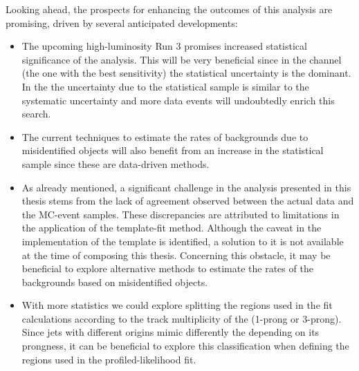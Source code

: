 Looking ahead, the prospects for enhancing the outcomes of this analysis are promising, driven by several anticipated developments:
\begin{itemize}
	\item The upcoming high-luminosity Run 3 promises increased statistical significance of the analysis.
		This will be very beneficial since in the \dilepSStau channel (the one with the best sensitivity)
		the statistical uncertainty is the dominant. In the \dilepOStau the uncertainty due to the statistical
		sample is similar to the systematic uncertainty and more data events will undoubtedly enrich this search.

	\item The current techniques to estimate the rates of backgrounds due to misidentified objects will also
		benefit from an increase in the statistical sample since these are data-driven methods.

	\item As already mentioned, a significant challenge in the analysis presented in this thesis stems from the 
		lack of agreement observed between the actual data and the MC-event samples. 
		These discrepancies are attributed to limitations in the application of the template-fit method.
		Although the caveat in the implementation of the template is identified, a solution to it is not available at the time of composing this thesis.
		Concerning this obstacle, it may be beneficial to explore alternative methods to estimate the rates of the backgrounds based on misidentified objects.

		
	\item With more statistics we could explore splitting the regions used in the fit calculations
		according to the track multiplicity of the \tauhad (1-prong or 3-prong). %
		Since jets with different origins mimic differently the \tauhad depending on its prongness,
		it can be beneficial to explore this classification when defining the regions used in
		the profiled-likelihood fit.
		

\end{itemize}
